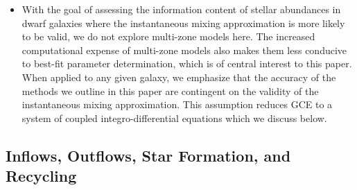 \documentclass[ms.tex]{subfiles}
\begin{document}
\begin{itemize}
	\item With the goal of assessing the information content of stellar
	abundances in dwarf galaxies where the instantaneous mixing approximation
	is more likely to be valid, we do not explore multi-zone models here.
	The increased computational expense of multi-zone models also makes them
	less conducive to best-fit parameter determination, which is of central
	interest to this paper.
	When applied to any given galaxy, we emphasize that the accuracy of the
	methods we outline in this paper are contingent on the validity of the
	instantaneous mixing approximation.
	This assumption reduces GCE to a system of coupled integro-differential
	equations which we discuss below.

\end{itemize}

\subsection{Inflows, Outflows, Star Formation, and Recycling}
\label{sec:onezone:gas}
\end{document}
